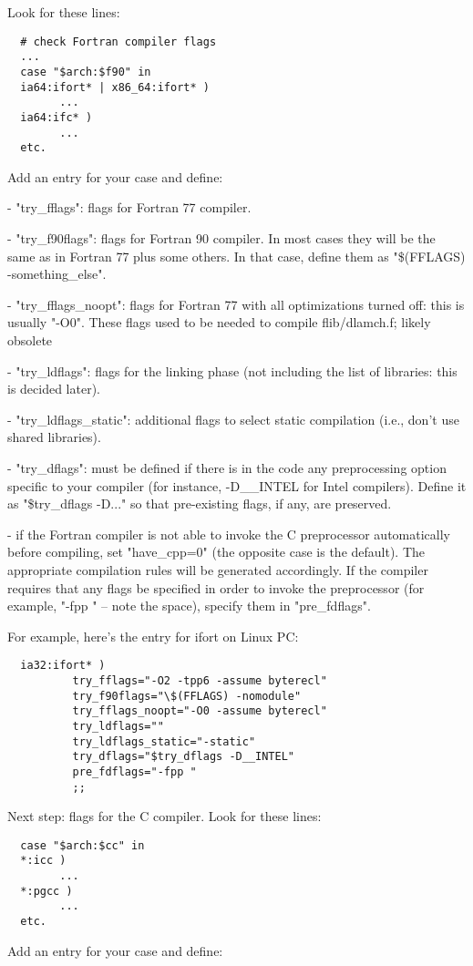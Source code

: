 \documentclass[12pt,a4paper]{article}
\begin{document}
\begin{enumerate}
Look for these lines:
\begin{verbatim}
  # check Fortran compiler flags
  ...
  case "$arch:$f90" in
  ia64:ifort* | x86_64:ifort* )
        ...
  ia64:ifc* )
        ...
  etc.
\end{verbatim}
Add an entry for your case and define:

- "try\_fflags": flags for Fortran 77 compiler.

- "try\_f90flags": flags for Fortran 90 compiler.
In most cases they will be the same as in Fortran 77 plus some
others.  In that case, define them as "\$(FFLAGS) -something\_else".

- "try\_fflags\_noopt": flags for Fortran 77 with all optimizations
turned off: this is usually "-O0".
These flags used to be needed to compile flib/dlamch.f; likely obsolete

- "try\_ldflags": flags for the linking phase (not including the list
of libraries: this is decided later).

- "try\_ldflags\_static": additional flags to select static compilation
(i.e., don't use shared libraries).

- "try\_dflags": must be defined if there is in the code any preprocessing
option specific to your compiler (for instance, -D\_\_INTEL for Intel
compilers).  Define it as "\$try\_dflags -D..." so that pre-existing
flags, if any, are preserved.

- if the Fortran compiler is not able to invoke the C preprocessor
automatically before compiling, set "have\_cpp=0" (the opposite case
is the default). The appropriate compilation rules will be generated
accordingly. If the compiler requires that any flags be specified in
order to invoke the preprocessor (for example, "-fpp " -- note the
space), specify them in "pre\_fdflags".

For example, here's the entry for ifort on Linux PC:
\begin{verbatim}
  ia32:ifort* )
          try_fflags="-O2 -tpp6 -assume byterecl"
          try_f90flags="\$(FFLAGS) -nomodule"
          try_fflags_noopt="-O0 -assume byterecl"
          try_ldflags=""
          try_ldflags_static="-static"
          try_dflags="$try_dflags -D__INTEL"
          pre_fdflags="-fpp "
          ;;
\end{verbatim}
Next step: flags for the C compiler. Look for these lines:
\begin{verbatim}
  case "$arch:$cc" in
  *:icc )
        ...
  *:pgcc )
        ...
  etc.
\end{verbatim}
Add an entry for your case and define:


\end{enumerate}
\end{document}
